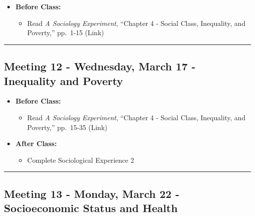 \documentclass[
]{book}
\providecommand{\tightlist}{%
  \setlength{\itemsep}{0pt}\setlength{\parskip}{0pt}}
\begin{document}
\begin{itemize}
\tightlist
\item
  \textbf{Before Class:}

  \begin{itemize}
  \tightlist
  \item
    Read \emph{A Sociology Experiment}, ``Chapter 4 - Social Class, Inequality, and Poverty,'' pp.~1-15 (Link)
  \end{itemize}
\end{itemize}

\begin{center}\rule{0.5\linewidth}{0.5pt}\end{center}

\hypertarget{meeting-12---wednesday-march-17---inequality-and-poverty}{%
\subsection*{Meeting 12 - Wednesday, March 17 - Inequality and Poverty}\label{meeting-12---wednesday-march-17---inequality-and-poverty}}

\begin{itemize}
\tightlist
\item
  \textbf{Before Class:}

  \begin{itemize}
  \tightlist
  \item
    Read \emph{A Sociology Experiment}, ``Chapter 4 - Social Class, Inequality, and Poverty,'' pp.~15-35 (Link)
  \end{itemize}
\item
  \textbf{After Class:}

  \begin{itemize}
  \tightlist
  \item
    Complete Sociological Experience 2
  \end{itemize}
\end{itemize}

\begin{center}\rule{0.5\linewidth}{0.5pt}\end{center}

\hypertarget{meeting-13---monday-march-22---socioeconomic-status-and-health}{%
\subsection*{Meeting 13 - Monday, March 22 - Socioeconomic Status and Health}\label{meeting-13---monday-march-22---socioeconomic-status-and-health}}
\end{document}
